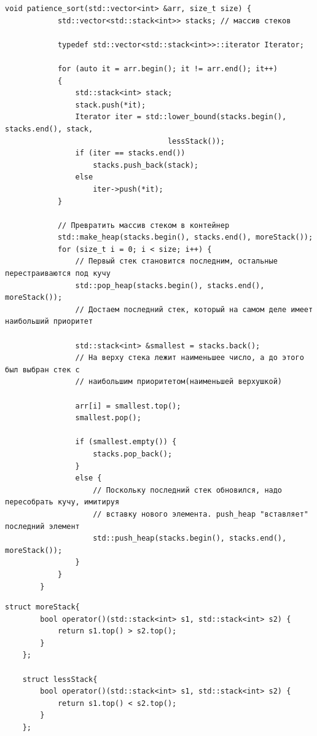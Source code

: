 \documentclass[a4paper, 14pt]{article}
\begin{document}
	\begin{lstlisting}[label=patience,caption=Терпеливая сортировка]
       void patience_sort(std::vector<int> &arr, size_t size) {
            std::vector<std::stack<int>> stacks; // массив стеков
        
            typedef std::vector<std::stack<int>>::iterator Iterator;
        
            for (auto it = arr.begin(); it != arr.end(); it++)
            {
                std::stack<int> stack;
                stack.push(*it);
                Iterator iter = std::lower_bound(stacks.begin(), stacks.end(), stack,
                                     lessStack());
                if (iter == stacks.end())
                    stacks.push_back(stack);
                else
                    iter->push(*it);
            }
        
            // Превратить массив стеком в контейнер
            std::make_heap(stacks.begin(), stacks.end(), moreStack());
            for (size_t i = 0; i < size; i++) {
                // Первый стек становится последним, остальные перестраиваются под кучу
                std::pop_heap(stacks.begin(), stacks.end(), moreStack());
                // Достаем последний стек, который на самом деле имеет наибольший приоритет
                
                std::stack<int> &smallest = stacks.back();
                // На верху стека лежит наименьшее число, а до этого был выбран стек с
                // наибольшим приоритетом(наименьшей верхушкой)
                
                arr[i] = smallest.top();
                smallest.pop();
                
                if (smallest.empty()) {
                    stacks.pop_back();
                } 
                else {
                    // Поскольку последний стек обновился, надо пересобрать кучу, имитируя
                    // вставку нового элемента. push_heap "вставляет" последний элемент
                    std::push_heap(stacks.begin(), stacks.end(), moreStack());
                }
            }
        }
	\end{lstlisting}
	
	\begin{lstlisting}[label=compare,caption=Структуры lessStack и moreStack]
    struct moreStack{
        bool operator()(std::stack<int> s1, std::stack<int> s2) {
            return s1.top() > s2.top();
        }
    };
    
    struct lessStack{
        bool operator()(std::stack<int> s1, std::stack<int> s2) {
            return s1.top() < s2.top();
        }
    };

	\end{lstlisting}
	
\end{document}
